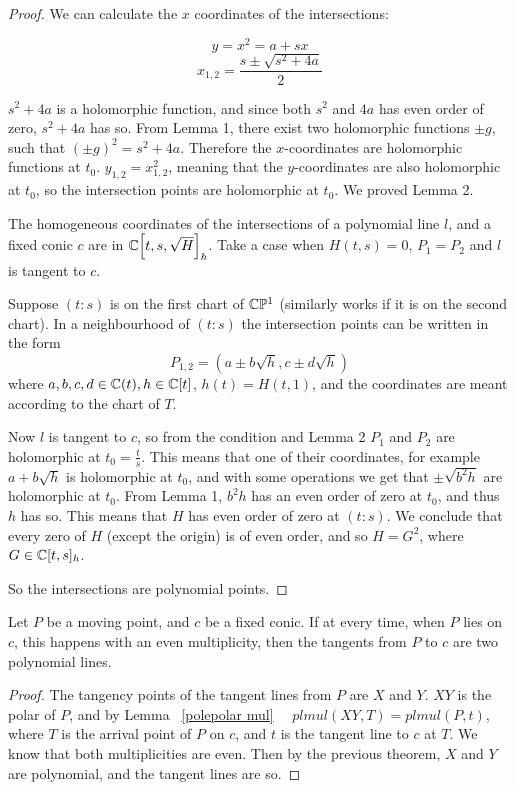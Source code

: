 \documentclass[a4paper]{article}
\begin{document}
\begin{proof}
    We can calculate the $x$ coordinates of the intersections:

    $$y=x^2=a+sx$$
    $$x_{1,2}=\frac{s \pm \sqrt{s^2+4a}}{2}$$

    $s^2+4a$ is a holomorphic function, and since both $s^2$ and $4a$ has even order of zero, $s^2+4a$ has so. From Lemma 1, there exist two holomorphic functions $\pm g$, such that $(\pm g)^2=s^2+4a$. Therefore the $x$-coordinates are holomorphic functions at $t_0$. $y_{1,2}=x_{1,2}^2$, meaning that the $y$-coordinates are also holomorphic at $t_0$, so the intersection points are holomorphic at $t_0$.
    We proved Lemma 2.


    The homogeneous coordinates of the intersections of a polynomial line $l$, and a fixed conic $c$ are in $\mathbb{C}\Bigl[t,s,\sqrt{H}\Bigr]_h$.
    Take a case when $H(t,s)=0$, $P_1=P_2$ and $l$ is tangent to $c$.

    Suppose $(t:s)$ is on the first chart of $\mathbb{C}\mathbb{P}^1$ (similarly works if it is on the second chart). In a neighbourhood of $(t:s)$ the intersection points can be written in the form
    $$P_{1,2} = \left(a \pm b\sqrt{h} , c \pm d\sqrt{h}\right)$$
    where $a,b,c,d\in \mathbb{C}(t), h\in \mathbb{C}[t]$, $h(t)=H(t,1)$, and the coordinates are meant according to the chart of $T$.

    Now $l$ is tangent to $c$, so from the condition and Lemma 2 $P_1$ and $P_2$ are holomorphic at $t_0=\frac{t}{s}$. This means that one of their coordinates, for example $a + b\sqrt{h}$ is holomorphic at $t_0$, and with some operations we get that $\pm\sqrt{b^2h}$ are holomorphic at $t_0$. From Lemma 1, $b^2h$ has an even order of zero at $t_0$, and thus $h$ has so. This means that $H$ has even order of zero at $(t:s)$.
    We conclude that every zero of $H$ (except the origin) is of even order, and so $H=G^2$, where $G\in\mathbb{C}[t,s]_h$.

    So the intersections are polynomial points.
\end{proof}

\begin{theorem}
    Let $P$ be a moving point, and $c$ be a fixed conic. If at every time, when $P$ lies on $c$, this happens with an even multiplicity, then the tangents from $P$ to $c$ are two polynomial lines.
\end{theorem}

\begin{proof}
    The tangency points of the tangent lines from $P$ are $X$ and $Y$. $XY$ is the polar of $P$, and by Lemma ~\ref{polepolar mul} $\quad plmul(XY,T)=plmul(P,t)$, where $T$ is the arrival point of $P$ on $c$, and $t$ is the tangent line to $c$ at $T$. We know that both multiplicities are even. Then by the previous theorem, $X$ and $Y$ are polynomial, and the tangent lines are so.
\end{proof}
\end{document}
